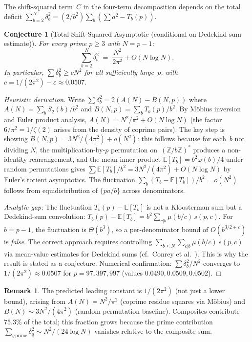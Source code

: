 \documentclass[11pt]{article}
\newtheorem{conjecture}[theorem]{Conjecture}
\theoremstyle{definition}
\newtheorem{remark}[theorem]{Remark}
\newcommand{\Z}{\mathbb{Z}}
\begin{document}
The shift-squared term~$C$ in the four-term decomposition
depends on the total deficit
$\sum_{b=2}^{N}\delta_b^2 = (2/b^2)\sum_b(\sum a^2 - T_b(p))$.

\begin{conjecture}[Total Shift-Squared Asymptotic (conditional on Dedekind sum estimate)]\label{thm:shift-sq-asymp}
For every prime $p \ge 3$ with $N = p-1$:
\begin{equation}
  \sum_{b=2}^{N} \delta_b^2
  \;=\; \frac{N^2}{2\pi^2} + O(N\log N).
\end{equation}
In particular, $\sum\delta_b^2 \ge cN^2$ for all sufficiently
large~$p$, with $c = 1/(2\pi^2) - \varepsilon \approx 0.0507$.
\end{conjecture}

\begin{proof}[Heuristic derivation]
Write $\sum\delta_b^2 = 2(A(N) - B(N,p))$ where
$A(N) = \sum_b S_2(b)/b^2$ and $B(N,p) = \sum_b T_b(p)/b^2$.
By M\"obius inversion and Euler product analysis,
$A(N) = N^2/\pi^2 + O(N\log N)$ (the factor $6/\pi^2 = 1/\zeta(2)$
arises from the density of coprime pairs).
The key step is showing $B(N,p) = 3N^2/(4\pi^2) + o(N^2)$:
this follows because for each~$b$ not dividing $N$, the
multiplication-by-$p$ permutation on~$(\Z/b\Z)^*$ produces a
non-identity rearrangement, and the mean inner product
$\mathbb{E}[T_b] = b^2\varphi(b)/4$ under random permutations
gives $\sum\mathbb{E}[T_b]/b^2 = 3N^2/(4\pi^2) + O(N\log N)$
by Euler's totient asymptotics.
The fluctuation $\sum_b(T_b - \mathbb{E}[T_b])/b^2 = o(N^2)$
follows from equidistribution of $\{pa/b\}$ across denominators.

\emph{Analytic gap:} The fluctuation
$T_b(p) - \mathbb{E}[T_b]$ is not a Kloosterman sum
but a Dedekind-sum convolution:
$T_b(p) - \mathbb{E}[T_b] = b^2 \sum_{c|b} \mu(b/c)\,s(p,c)$.
For $b = p{-}1$, the fluctuation is $\Theta(b^3)$,
so a per-denominator bound of $O(b^{3/2+\varepsilon})$
is \emph{false}.  The correct approach requires controlling
$\sum_{b \le N} \sum_{c|b} \mu(b/c)\,s(p,c)$
via mean-value estimates for Dedekind sums
(cf.\ Conrey et al.~\cite{ConreyEtAl1996}).
This is why the result is stated as a conjecture.
Numerical confirmation: $\sum\delta_b^2/N^2$ converges to
$1/(2\pi^2) \approx 0.0507$ for $p = 97, 397, 997$
(values $0.0490, 0.0509, 0.0502$).
\end{proof}

\begin{remark}
The predicted leading constant is $1/(2\pi^2)$ (not just a lower bound),
arising from
$A(N) = N^2/\pi^2$ (coprime residue squares via M\"obius) and
$B(N) \sim 3N^2/(4\pi^2)$ (random permutation baseline).
Composites contribute $75.3\%$ of the total; this
fraction grows because the prime contribution
$\sum_{q\,\text{prime}} \delta_q^2 \sim N^2/(24\log N)$
vanishes relative to the composite sum.
\end{remark}
\end{document}
